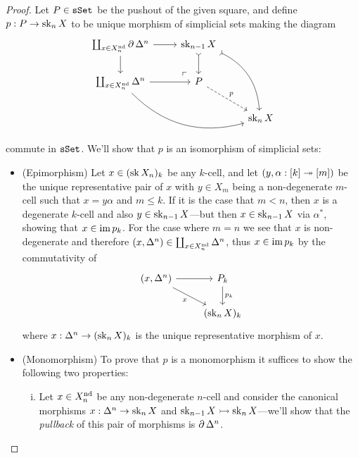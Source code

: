 \begin{proof}
    Let \(P \in {\texttt{sSet}}\) be the pushout of the given square, and define
    \(p: P \to \operatorname{sk}_n X\) to be unique morphism of simplicial sets making the diagram
    \[
        \begin{tikzcd}
            \coprod_{x \in X_n^{\Nondeg}} \Bd \Delta^n
            \ar[rd, phantom, very near end, "\ulcorner"]
            \ar[r] \ar[d]
            &\Sk_{n-1} X
            \ar[d, tail]
            \ar[rdd, tail, bend left]
            &
            \\
            \coprod_{x \in X_n^{\Nondeg}} \Delta^n
            \ar[rrd, bend right]
            \ar[r]
            &P \ar[rd, dashed, "p"]
            &
            \\
            &&\Sk_n X
        \end{tikzcd}
    \]
    commute in \({\texttt{sSet}}\). We'll show that \(p\) is an isomorphism of simplicial
    sets:
    \begin{itemize}\setlength\itemsep{0em}
        \item (Epimorphism) Let \(x \in (\operatorname{sk} X_n)_k\) be any \(k\)-cell, and let
              \((y, \alpha: [k] \twoheadrightarrow [m])\) be the unique representative pair of \(x\) with
              \(y \in X_m\) being a non-degenerate \(m\)-cell such that
              \(x = y \alpha\) and \(m \leq k\). If it is the case that \(m < n\), then
              \(x\) is a degenerate \(k\)-cell and also \(y \in \operatorname{sk}_{n-1} X\)---but then
              \(x \in \operatorname{sk}_{n-1} X\) via \(\alpha^{*}\), showing that \(x \in \operatorname{im} p_k\). For
              the case where \(m = n\) we see that \(x\) is non-degenerate and therefore
              \((x, \Delta^n) \in \coprod_{x \in X_n^{\operatorname{nd}}} \Delta^n\), thus
              \(x \in \operatorname{im} p_k\) by the commutativity of
              \[
                  \begin{tikzcd}
                      {(x, \splx^n)}
                      \ar[r]
                      \ar[rd, "x"']
                      &P_k \ar[d, "p_k"] \\
                      &{(\Sk_n X)_{k}}
                  \end{tikzcd}
              \]
              where \(x: \Delta^n \to (\operatorname{sk}_n X)_k\) is the unique representative morphism of
              \(x\).

        \item (Monomorphism) To prove that \(p\) is a monomorphism it suffices to show
              the following two properties:
              \begin{enumerate}[(i)]\setlength\itemsep{0em}
                  \item Let \(x \in X_n^{\operatorname{nd}}\) be any non-degenerate \(n\)-cell and consider
                        the canonical morphisms \(x: \Delta^n \to \operatorname{sk}_n X\) and
                        \(\operatorname{sk}_{n-1} X \rightarrowtail \operatorname{sk}_n X\)---we'll show that the \emph{pullback} of this
                        pair of morphisms is \(\operatorname{\partial} \Delta^n\).


\end{enumerate}
\end{itemize}
\end{proof}
